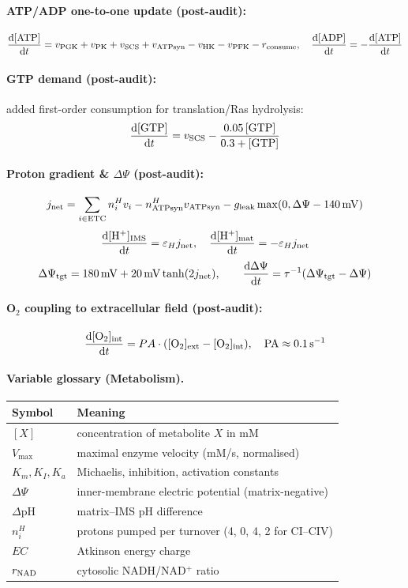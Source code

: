 \documentclass[11pt,a4paper]{article}
\newcommand{\eq}[1]{\begin{equation}#1\end{equation}}
\begin{document}
\paragraph{ATP/ADP one-to-one update (post-audit):}
\eq{ \frac{\mathrm d[\rm ATP]}{\mathrm dt} = v_{\rm PGK}+v_{\rm PK}+v_{\rm SCS}+v_{\rm ATPsyn} - v_{\rm HK}-v_{\rm PFK}-r_{\rm consume},\quad \frac{\mathrm d[\rm ADP]}{\mathrm dt}=-\frac{\mathrm d[\rm ATP]}{\mathrm dt} }

\paragraph{GTP demand (post-audit):} added first-order consumption for translation/Ras hydrolysis:
\eq{ \frac{\mathrm d[\rm GTP]}{\mathrm dt} = v_{\rm SCS} - \frac{0.05\,[\rm GTP]}{0.3+[\rm GTP]} }

\paragraph{Proton gradient \& $\Delta\Psi$ (post-audit):}
\eq{ j_{\rm net}=\sum_{i\in\rm ETC} n^H_i v_i - n^H_{\rm ATPsyn}v_{\rm ATPsyn} - g_{\rm leak}\max(0,\Delta\Psi-\SI{140}{mV}) }
\eq{ \frac{\mathrm d[\rm H^+]_{\rm IMS}}{\mathrm dt}=\varepsilon_H j_{\rm net},\quad \frac{\mathrm d[\rm H^+]_{\rm mat}}{\mathrm dt}=-\varepsilon_H j_{\rm net} }
\eq{ \Delta\Psi_{\rm tgt}=\SI{180}{mV}+\SI{20}{mV}\tanh(2 j_{\rm net}),\qquad \frac{\mathrm d\Delta\Psi}{\mathrm dt}=\tau^{-1}(\Delta\Psi_{\rm tgt}-\Delta\Psi) }

\paragraph{O$_2$ coupling to extracellular field (post-audit):}
\eq{ \frac{\mathrm d[\rm O_2]_{\rm int}}{\mathrm dt} = PA\cdot([\rm O_2]_{\rm ext}-[\rm O_2]_{\rm int}),\quad PA\approx\SI{0.1}{s^{-1}} }

\paragraph{Variable glossary (Metabolism).}
\begin{tabular}{@{}ll@{}}\toprule
Symbol & Meaning \\\midrule
$[X]$ & concentration of metabolite $X$ in \si{mM} \\
$V_{\max}$ & maximal enzyme velocity (\si{mM/s}, normalised) \\
$K_m, K_I, K_a$ & Michaelis, inhibition, activation constants \\
$\Delta\Psi$ & inner-membrane electric potential (matrix-negative) \\
$\Delta\mathrm{pH}$ & matrix--IMS pH difference \\
$n^H_i$ & protons pumped per turnover (4, 0, 4, 2 for CI--CIV) \\
$EC$ & Atkinson energy charge \\
$r_{\rm NAD}$ & cytosolic NADH/NAD$^+$ ratio \\
\bottomrule\end{tabular}
\end{document}
